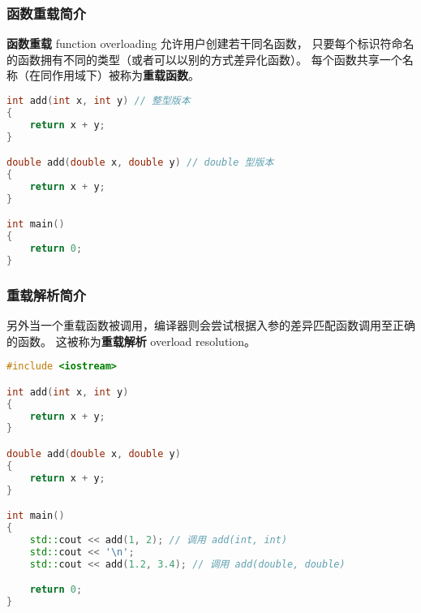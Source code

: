 \documentclass[../../LearnCpp.tex]{subfiles}
\begin{document}

\subsubsection*{函数重载简介}

\textbf{函数重载} function overloading 允许用户创建若干同名函数，
只要每个标识符命名的函数拥有不同的类型（或者可以以别的方式差异化函数）。
每个函数共享一个名称（在同作用域下）被称为\textbf{重载函数}。

\begin{lstlisting}[language=C++]
int add(int x, int y) // 整型版本
{
    return x + y;
}

double add(double x, double y) // double 型版本
{
    return x + y;
}

int main()
{
    return 0;
}
\end{lstlisting}

\subsubsection*{重载解析简介}

另外当一个重载函数被调用，编译器则会尝试根据入参的差异匹配函数调用至正确的函数。
这被称为\textbf{重载解析} overload resolution。

\begin{lstlisting}[language=C++]
#include <iostream>

int add(int x, int y)
{
    return x + y;
}

double add(double x, double y)
{
    return x + y;
}

int main()
{
    std::cout << add(1, 2); // 调用 add(int, int)
    std::cout << '\n';
    std::cout << add(1.2, 3.4); // 调用 add(double, double)

    return 0;
}
\end{lstlisting}
\end{document}
